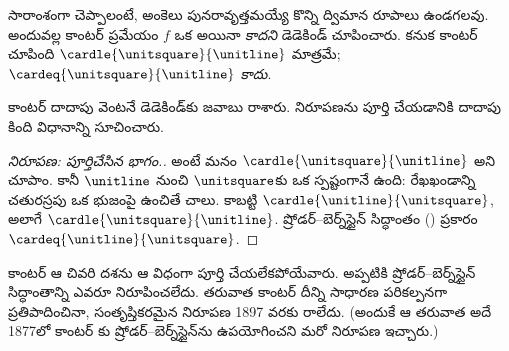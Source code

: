 \documentclass[../../../include/open-logic-section]{subfiles}
\begin{document}
సారాంశంగా చెప్పాలంటే, అంకెలు పునరావృత్తమయ్యే కొన్ని ద్విమాన రూపాలు ఉండగలవు. అందువల్ల కాంటర్ ప్రమేయం $f$ ఒక  అయినా  \emph{కాదని} డెడెకిండ్ చూపించారు. కనుక కాంటర్ చూపింది $\cardle{\unitsquare}{\unitline}$ మాత్రమే; $\cardeq{\unitsquare}{\unitline}$ \emph{కాదు}.

కాంటర్ దాదాపు వెంటనే డెడెకిండ్‌కు జవాబు రాశారు. నిరూపణను పూర్తి చేయడానికి దాదాపు కింది విధానాన్ని సూచించారు.

\begin{proof}[నిరూపణ: పూర్తిచేసిన భాగం.]
అంటే మనం $\cardle{\unitsquare}{\unitline}$ అని చూపాం. కానీ $\unitline$ నుంచి $\unitsquare$కు ఒక  స్పష్టంగానే ఉంది: రేఖఖండాన్ని చతురస్రపు ఒక భుజంపై ఉంచితే చాలు. కాబట్టి $\cardle{\unitline}{\unitsquare}$, అలాగే $\cardle{\unitsquare}{\unitline}$. ష్రోడర్--బెర్న్‌స్టైన్ సిద్ధాంతం () ప్రకారం $\cardeq{\unitline}{\unitsquare}$.
\end{proof}

కాంటర్ ఆ చివరి దశను ఆ విధంగా పూర్తి చేయలేకపోయేవారు. అప్పటికి ష్రోడర్--బెర్న్‌స్టైన్ సిద్ధాంతాన్ని ఎవరూ నిరూపించలేదు. తరువాత కాంటర్ దీన్ని సాధారణ పరికల్పనగా ప్రతిపాదించినా, సంతృప్తికరమైన నిరూపణ 1897 వరకు రాలేదు. (అందుకే ఆ తరువాత అదే 1877లో కాంటర్ కు ష్రోడర్--బెర్న్‌స్టైన్‌ను ఉపయోగించని మరో నిరూపణ ఇచ్చారు.)
\end{document}

